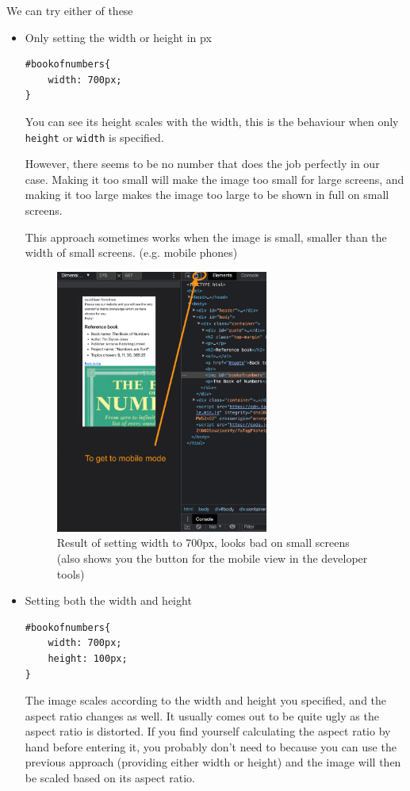 We can try either of these

\begin{itemize}
\item Only setting the width or height in px
    
\begin{lstlisting}[language=pug]
#bookofnumbers{
    width: 700px;
}
\end{lstlisting}

You can see its height scales with the width, this is the behaviour when only \texttt{height} or \texttt{width} is specified.

However, there seems to be no number that does the job perfectly in our case. Making it too small will make the image too small for large screens, and making it too large makes the image too large to be shown in full on small screens. 

This approach sometimes works when the image is small, smaller than the width of small screens. (e.g. mobile phones)

\begin{figure}[h]
\centering
\includegraphics[width=7cm]{images/chn6-widthonly.png}
\caption{Result of setting width to 700px, looks bad on small screens (also shows you the button for the mobile view in the developer tools)}
\end{figure}

\item Setting both the width and height

\begin{lstlisting}[language=pug]
#bookofnumbers{
    width: 700px;
    height: 100px;
}
\end{lstlisting}

The image scales according to the width and height you specified, and the aspect ratio changes as well. It usually comes out to be quite ugly as the aspect ratio is distorted. If you find yourself calculating the aspect ratio by hand before entering it, you probably don't need to because you can use the previous approach (providing either width or height) and the image will then be scaled based on its aspect ratio.


\end{itemize}
